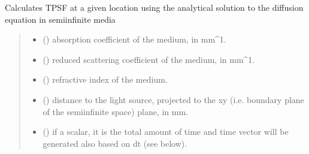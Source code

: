 \documentclass[letterpaper,10pt,english]{sphinxmanual}
\begin{document}
\begin{fulllineitems}
\label{\detokenize{_autosummary/nirfasterff.forward.analytical.semi_infinite_TR:nirfasterff.forward.analytical.semi_infinite_TR}}
\pysigstartsignatures
{}
\pysigstopsignatures
\sphinxAtStartPar
Calculates TPSF at a given location using the analytical solution to the diffusion equation in semi\sphinxhyphen{}infinite media
\begin{quote}\begin{description}
\begin{itemize}
\item {} 
\sphinxAtStartPar
{} () \textendash{} absorption coefficient of the medium, in mm\textasciicircum{}\sphinxhyphen{}1.

\item {} 
\sphinxAtStartPar
{} () \textendash{} reduced scattering coefficient of the medium, in mm\textasciicircum{}\sphinxhyphen{}1.

\item {} 
\sphinxAtStartPar
{} () \textendash{} refractive index of the medium.

\item {} 
\sphinxAtStartPar
{} () \textendash{} distance to the light source, projected to the x\sphinxhyphen{}y (i.e. boundary plane of the semi\sphinxhyphen{}infinite space) plane, in mm.

\item {} 
\sphinxAtStartPar
{} () \textendash{} 
\sphinxAtStartPar
if a scalar, it is the total amount of time and time vector will be generated also based on dt (see below).


\end{itemize}
\end{description}
\end{quote}
\end{fulllineitems}
\end{document}
